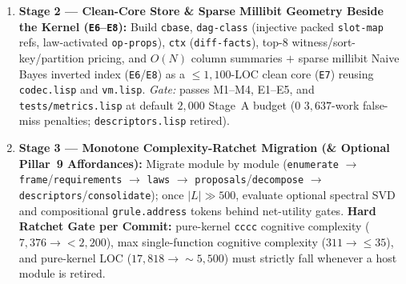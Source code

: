 \documentclass[12pt]{article}
\begin{document}
\begin{enumerate}[leftmargin=1.6em, itemsep=0.25em]
\begin{itemize}[leftmargin=1.4em, itemsep=0.12em]
    \item \textbf{E4 (Meta \texttt{(:probe ...)} $+$ 4-Bucket Causal Attribution):} Expose \texttt{:code}-valued columns in \texttt{SearchTrace}, add active disambiguating queries (varying non-commuting \texttt{:code} arguments so e.g.\ $6$-bit \texttt{:-} cannot impersonate \texttt{foldl}'s $48$-bit \texttt{:code-eval}), and run the 4-Bucket Attribution Protocol (with $2 W_{\mathrm{tariff}}$ micro-probes protecting dead-branch nogoods). \emph{Gate:} eliminates all three \texttt{foldl}/\texttt{last-or} impostor classes and archives zero-utility entries without losing valid nogoods.
    \item \textbf{E5 (Parameter-Varying Recursion $+$ Behavior-Indexed Coupled Hash-Join $+$ Wake--Sleep Bootstrap):} Add general self-call argument holes \texttt{(<self> (tail xs) H\_1 ...)} with CEGAR root replay, replace the $4$-model coupled cap with behavior-deduplicated $O(|D_1|+|D_2|)$ hash-join / residual specialization, and induce \texttt{functors.sexp} + \texttt{:comprehension/filter-map} via DAG anti-unification under offline wake--sleep budgets (minutes--hours permitted, $10^7$--$5\times 10^8$ work/spec). \emph{Gate:} cold-bootstraps all $8$ batteries under unwhitelisted grammars with \textbf{\texttt{bootstrap/\allowbreak recursion-\allowbreak schemas.lisp} deleted ($-355$ LOC, $-321$ cognitive complexity) and $0$ hand-built library ASTs}, while warm suite replay stays $<15\,\mathrm{s}$.
  \end{itemize}

  \item \textbf{Stage 2 --- Clean-Core Store \& Sparse Millibit Geometry Beside the Kernel (\texttt{E6}--\texttt{E8}):}
  Build \texttt{cbase}, \texttt{dag-class} (injective packed \texttt{slot-map} refs, law-activated \texttt{op-props}), \texttt{ctx} (\texttt{diff-facts}), top-8 witness/sort-key/partition pricing, and $O(N)$ column summaries $+$ sparse millibit Naive Bayes inverted index (\texttt{E6}/\texttt{E8}) as a $\le 1,100$-LOC clean core (\texttt{E7}) reusing \texttt{codec.lisp} and \texttt{vm.lisp}. \emph{Gate:} passes M1--M4, E1--E5, and \texttt{tests/metrics.lisp} at default $2,000$ Stage~A budget ($0$ $3,637$-work false-miss penalties; \texttt{descriptors.lisp} retired).

  \item \textbf{Stage 3 --- Monotone Complexity-Ratchet Migration (\& Optional Pillar~9 Affordances):}
  Migrate module by module (\texttt{enumerate} $\to$ \texttt{frame}/\texttt{requirements} $\to$ \texttt{laws} $\to$ \texttt{proposals}/\texttt{decompose} $\to$ \texttt{descriptors}/\texttt{consolidate}); once $|L|\gg 500$, evaluate optional spectral SVD and compositional \texttt{grule.address} tokens behind net-utility gates. \textbf{Hard Ratchet Gate per Commit:} pure-kernel \texttt{cccc} cognitive complexity ($7,376 \to <2,200$), max single-function cognitive complexity ($311 \to \le 35$), and pure-kernel LOC ($17,818 \to \sim 5,500$) must strictly fall whenever a host module is retired.
\end{enumerate}
\end{document}
